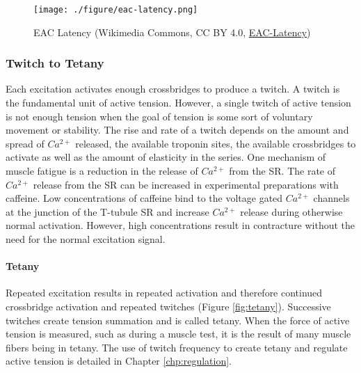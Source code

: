 \begin{figure}[!ht]
    \centering
    \texttt{[image: ./figure/eac-latency.png]}
    \caption{EAC Latency \footnotesize{(Wikimedia Commons, CC BY 4.0, \href{https://commons.wikimedia.org/wiki/File:The_latent_period_between_the_muscle_action_potential_and_contraction.png}{EAC-Latency})}}
    \label{fig:eac-latency}
\end{figure}

\subsubsection{Twitch to Tetany}
Each excitation activates enough crossbridges to produce a twitch. A twitch is the fundamental unit of active tension. However, a single twitch of active tension is not enough tension when the goal of tension is some sort of voluntary movement or stability. The rise and rate of a twitch depends on the amount and spread of $Ca^{2+}$ released, the available troponin sites, the available crossbridges to activate as well as the amount of elasticity in the series. One mechanism of muscle fatigue is a reduction in the release of $Ca^{2+}$ from the SR. The rate of $Ca^{2+}$ release from the SR can be increased in experimental preparations with caffeine. Low concentrations of caffeine bind to the voltage gated $Ca^{2+}$ channels at the junction of the T-tubule SR and increase $Ca^{2+}$ release during otherwise normal activation. However, high concentrations result in contracture without the need for the normal excitation signal. 



\paragraph{Tetany}
Repeated excitation results in repeated activation and therefore continued crossbridge activation and repeated twitches (Figure \ref{fig:tetany}). Successive twitches create tension summation and is called tetany. When the force of active tension is measured, such as during a muscle test, it is the result of many muscle fibers being in tetany. The use of twitch frequency to create tetany and regulate active tension is detailed in Chapter \ref{chp:regulation}. 


